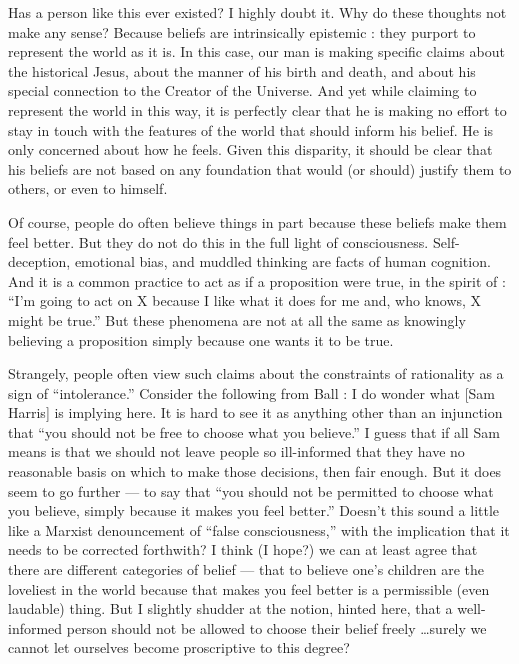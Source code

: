 \documentclass[a4paper,14pt]{extarticle}
\begin{document}
Has a person like this ever existed?
I highly doubt it.
Why do these thoughts not make any sense?
Because beliefs are intrinsically epistemic :
they purport to represent the world as it is.
In this case, our man is making specific claims about the historical Jesus, about the manner of his birth and death, and about his special connection to the Creator of the Universe.
And yet while claiming to represent the world in this way, it is perfectly clear that he is making no effort to stay in touch with the features of the world that should inform his belief.
He is only concerned about how he feels.
Given this disparity, it should be clear that his beliefs are not based on any foundation that would (or should) justify them to others, or even to himself.

Of course, people do often believe things in part because these beliefs make them feel better.
But they do not do this in the full light of consciousness. Self-deception, emotional bias, and muddled thinking are facts of human cognition.
And it is a common practice to act as if a proposition were true, in the spirit of :
``I’m going to act on X because I like what it does for me and, who knows, X might be true.''
But these phenomena are not at all the same as knowingly believing a proposition simply because one wants it to be true.

Strangely, people often view such claims about the constraints of rationality as a sign of ``intolerance.''
Consider the following from Ball :
I do wonder what [Sam Harris] is implying here.
It is hard to see it as anything other than an injunction that ``you should not be free to choose what you believe.''
I guess that if all Sam means is that we should not leave people so ill-informed that they have no reasonable basis on which to make those decisions, then fair enough.
But it does seem to go further --- to say that ``you should not be permitted to choose what you believe, simply because it makes you feel better.''
Doesn’t this sound a little like a Marxist denouncement of ``false consciousness,'' with the implication that it needs to be corrected forthwith?
I think (I hope?) we can at least agree that there are different categories of belief --- that to believe one’s children are the loveliest in the world because that makes you feel better is a permissible (even laudable) thing.
But I slightly shudder at the notion, hinted here, that a well-informed person should not be allowed to choose their belief freely \dots surely we cannot let ourselves become proscriptive to this degree?
\end{document}
